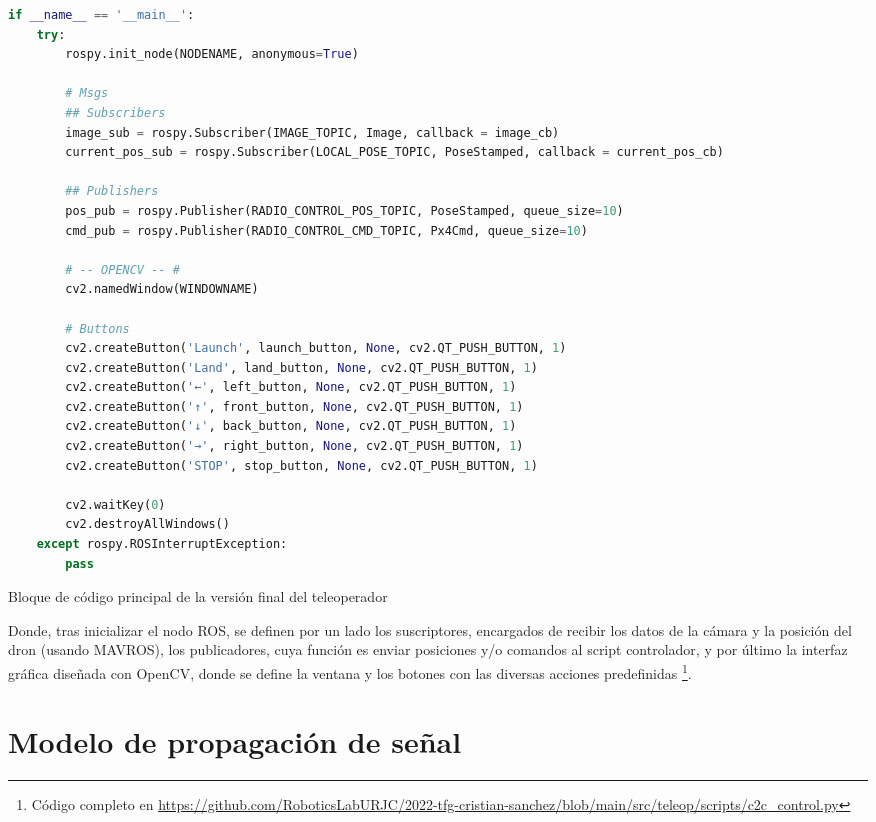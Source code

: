 \begin{code}[H]
\begin{lstlisting}[language=Python]
if __name__ == '__main__':
    try:
        rospy.init_node(NODENAME, anonymous=True)

        # Msgs
        ## Subscribers
        image_sub = rospy.Subscriber(IMAGE_TOPIC, Image, callback = image_cb)
        current_pos_sub = rospy.Subscriber(LOCAL_POSE_TOPIC, PoseStamped, callback = current_pos_cb)

        ## Publishers
        pos_pub = rospy.Publisher(RADIO_CONTROL_POS_TOPIC, PoseStamped, queue_size=10)
        cmd_pub = rospy.Publisher(RADIO_CONTROL_CMD_TOPIC, Px4Cmd, queue_size=10)

        # -- OPENCV -- #
        cv2.namedWindow(WINDOWNAME)

        # Buttons
        cv2.createButton('Launch', launch_button, None, cv2.QT_PUSH_BUTTON, 1)
        cv2.createButton('Land', land_button, None, cv2.QT_PUSH_BUTTON, 1)
        cv2.createButton('←', left_button, None, cv2.QT_PUSH_BUTTON, 1)
        cv2.createButton('↑', front_button, None, cv2.QT_PUSH_BUTTON, 1)
        cv2.createButton('↓', back_button, None, cv2.QT_PUSH_BUTTON, 1)
        cv2.createButton('→', right_button, None, cv2.QT_PUSH_BUTTON, 1)
        cv2.createButton('STOP', stop_button, None, cv2.QT_PUSH_BUTTON, 1)

        cv2.waitKey(0)
        cv2.destroyAllWindows()
    except rospy.ROSInterruptException:
        pass
\end{lstlisting}
\caption[Bloque de código principal de la versión final del teleoperador]{Bloque de código principal de la versión final del teleoperador}
\label{cod:c2c_app}
\end{code}

Donde, tras inicializar el nodo \ac{ROS}, se definen por un lado los suscriptores, encargados de recibir los datos de la cámara y la posición del dron (usando MAVROS), los publicadores, cuya función es enviar posiciones y/o comandos al script controlador, y por último la interfaz gráfica diseñada con OpenCV, donde se define la ventana y los botones con las diversas acciones predefinidas \footnote{Código completo en \url{https://github.com/RoboticsLabURJC/2022-tfg-cristian-sanchez/blob/main/src/teleop/scripts/c2c_control.py}}.\\

\section{Modelo de propagación de señal}
\label{sec:signals}

